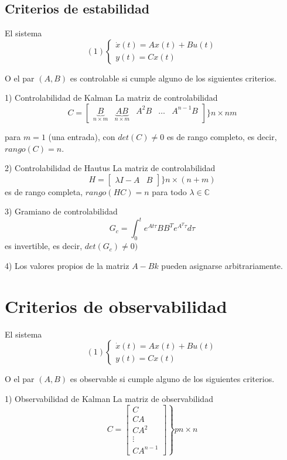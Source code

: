 \subsection{Criterios de estabilidad}

El sistema 
\[
    (1)
    \left\{
        \begin{array}{lll}
            \dot{x}(t) = Ax(t) + Bu(t)\\
            y(t) = Cx(t)
        \end{array}
    \right.
\]

O el par \( (A, B)\) es controlable si cumple alguno de los siguientes criterios.

1) Controlabilidad de Kalman
La matriz de controlabilidad
\[
    C = 
    \begin{bmatrix}
        \underbrace{B}_{n\times m} &
        \underbrace{AB}_{n\times m} &
        A^{2}B & \ldots & A^{n-1}B
    \end{bmatrix}
    \Big\} n\times nm
\]

para \( m=1 \) (una entrada), con \( det(C)\not= 0 \) es de rango completo, es decir, \( rango(C)=n \).

2) Controlabilidad de Hautus
La matriz de controlabilidad
\[
    H =
    \begin{bmatrix}
        \lambda I-A & B
    \end{bmatrix}
    \Big \} n\times(n+m)
\]
es de rango completa, \( rango(HC)=n \) para todo \( \lambda \in \mathbb{C} \)

3) Gramiano de controlabilidad
\[
    G_{c} = \int_{0}^{t} e^{At\tau}BB^{T}e^{A^{T}\tau}d\tau
\]
es invertible, es decir, \( det(G_{c}) \not= 0) \)

4) Los valores propios de la matriz \( A-Bk \) pueden asignarse arbitrariamente.

\section{Criterios de observabilidad}
El sistema 
\[
    (1)
    \left\{
        \begin{array}{lll}
            \dot{x}(t) = Ax(t) + Bu(t)\\
            y(t) = Cx(t)
        \end{array}
    \right.
\]

O el par \( (A, B)\) es observable si cumple alguno de los siguientes criterios.

1) Observabilidad de Kalman
La matriz de observabilidad
\[
    C = 
    \left.
    \begin{bmatrix}
        C \\
        CA \\
        CA^{2} \\ \vdots \\
        CA^{n-1}
    \end{bmatrix}
    \right\} pn\times n
\]

